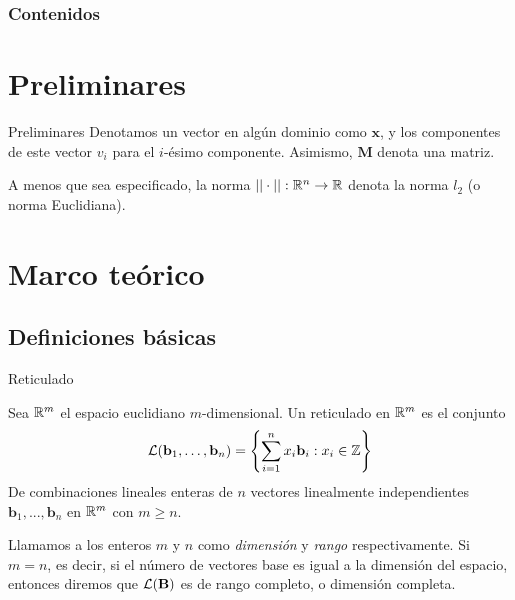 


\frame{\titlepage}

\begin{frame}
\frametitle{Contenidos}
\tableofcontents
\end{frame}

\section{Preliminares}
\begin{frame}{Preliminares}
Denotamos un vector en algún dominio como $\mathbf x$, y los componentes de este vector $v_i$ para el $i$-ésimo componente. Asimismo, $\mathbf M$ denota una matriz.

A menos que sea especificado, la norma $||\cdot ||: \mathbb{R}^n \to \mathbb{R}$ denota la norma $l_2$ (o norma Euclidiana).

\end{frame}
\section{Marco teórico}

\subsection{Definiciones básicas}
\begin{frame}{Reticulado}
\begin{definition}
Sea $\mathbb{R}^m$ el espacio euclidiano $m$-dimensional. Un reticulado en $\mathbb{R}^m$ es el conjunto
\[
\mathcal L(\mathbf{b}_1, \dots, \mathbf{b}_n) = \left\{\sum_{i = 1}^n x_i \mathbf{b}_i : x_i  \in \mathbb{Z}\right\}
\]
De combinaciones lineales enteras de $n$ vectores linealmente independientes $\mathbf{b}_1, ..., \mathbf{b}_n$ en $\mathbb{R}^m$ con $m \geq n$.
\end{definition}
Llamamos a los enteros $m$ y $n$ como {\it dimensión} y {\it rango} respectivamente. Si $m = n$, es decir, si el número de vectores base es igual a la dimensión del espacio, entonces diremos que $\mathcal{L}(\mathbf{B})$ es de rango completo, o dimensión completa.
\end{frame}

